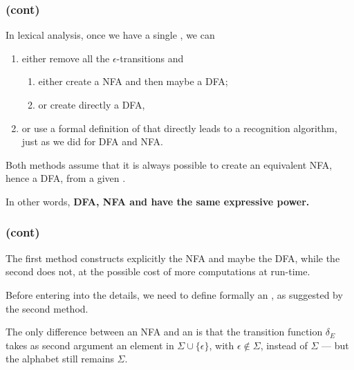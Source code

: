 % 
\begin{frame}
\frametitle{\eNFA (cont)}

In lexical analysis, once we have a single \eNFA, we can
\begin{enumerate}

  \item either remove all the \(\epsilon\)-transitions and 
  \begin{enumerate}
    \item either create a NFA and then maybe a DFA;

    \item or create directly a DFA,

  \end{enumerate}

  \item or use a formal definition of \eNFA that directly leads to a
  recognition algorithm, just as we did for DFA and NFA.

\end{enumerate}
Both methods assume that it is always possible to create an equivalent
NFA, hence a DFA, from a given \eNFA. 

\bigskip

In other words, \textbf{DFA, NFA and \eNFA have the same expressive
  power.}

\end{frame}

% 
\begin{frame}
\frametitle{\eNFA (cont)}

The first method constructs explicitly the NFA and maybe the DFA,
while the second does not, at the possible cost of more computations
at run-time.

\bigskip

Before entering into the details, we need to define formally an
\eNFA, as suggested by the second method.

\bigskip

The only difference between an NFA and an \eNFA is that the
transition function \(\delta_E\) takes as second argument an element
in \(\Sigma \cup \{\epsilon\}\), with \(\epsilon \not\in \Sigma\),
instead of \(\Sigma\) --- but the alphabet still remains \(\Sigma\).

\end{frame}

